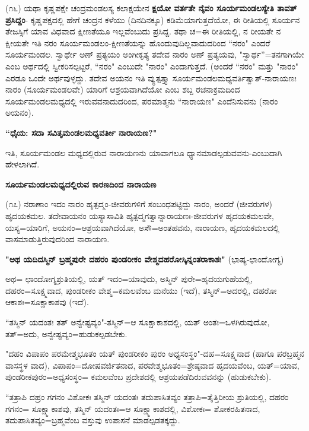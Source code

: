 (೧೬) ಯಥಾ ಕೃಷ್ಣಪಕ್ಷೇ ಚಂದ್ರಮಂಡಲಸ್ಯ ಕಲಾಕ್ಷಯೇನ \textbf{ಕ್ಷಯೋ ವರ್ತತೇ ನೈವಂ ಸೂರ್ಯಮಂಡಲಸ್ಯೇತಿ ತಾವತ್ ಪ್ರಸಿದ್ದಂ}- ಕೃಷ್ಣಪಕ್ಷದಲ್ಲಿ ಹೇಗೆ ಚಂದ್ರನ ಕಳೆಯು (ದಿನದಿನಕ್ಕೂ) ಕಡಿಮೆಯಾಗುತ್ತದೆಯೋ, ಈ ರೀತಿಯಲ್ಲಿ ಸೂರ್ಯನ ತೇಜಸ್ಸಿಗೆ ಯಾವ ವಿಧವಾದ ಕ್ಷೀಣತೆಯೂ ಇಲ್ಲವೆಂಬುದು ಪ್ರಸಿದ್ದ. ತಥಾ ಚ=ಈ ರೀತಿಯಲ್ಲಿ, ನ ರೀಯತೇ ನ ಕ್ಷೀಯತೇ ಇತಿ ನರಂ ಸೂರ್ಯಮಂಡಲಂ-ಕ್ಷೀಣತೆಯನ್ನು ಹೊಂದುವುದಿಲ್ಲವಾದುದರಿಂದ ``ನರಂ" ಎಂದರೆ ಸೂರ್ಯಮಂಡಲ. ಸ್ವಾರ್ಥೇ ಅಣ್ ಪ್ರತ್ಯಯಂ ಅಂಗೀಕೃತ್ಯ ತದೇವ ನಾರಂ ಅಣ್ ಪ್ರತ್ಯಯವು, "ಸ್ವಾರ್ಥ''=ತನಗಾಗಿಯೇ ಎಂಬ ಅರ್ಥದಲ್ಲಿ ಸ್ವೀಕರಿಸಲ್ಪಟ್ಟರೆ, ``ನರಂ" ಎಂಬುದೇ "ನಾರಂ" ಎಂದಾಗುತ್ತದೆ. (ಅಂದರೆ “ನರಂ" ಮತ್ತು "ನಾರಂ" ಎರಡೂ ಒಂದೇ ಅರ್ಥವುಳ್ಳದ್ದು. ತದೇವ ಅಯನಂ ಇತಿ ವ್ಯುತ್ಪತ್ತ್ಯಾ ಸೂರ್ಯಮಂಡಲಮಧ್ಯವರ್ತಿತ್ವಾತ್-ನಾರಾಯಣಃ ನಾರಂ (ಸೂರ್ಯಮಂಡಲವೇ) ಯಾರಿಗೆ ಆಶ್ರಯವಾಗಿದೆಯೋ ಎಂಬ ಶಬ್ದ ರಚನಾಕ್ರಮದಿಂದ ಸೂರ್ಯಮಂಡಲಮಧ್ಯದಲ್ಲಿ ಇರುವವನಾದುದರಿಂದ, ಪರಮಾತ್ಮನು ``ನಾರಾಯಣ" ಎಂದೆನಿಸುವನು (ನಾರಂ ಅಯನಂ).

\begin{center}
\textbf{``ಧೈಯ: ಸದಾ ಸವಿತೃಮಂಡಲಮಧ್ಯವರ್ತೀ ನಾರಾಯಣ?"}
\end{center}

\noindent
ಇತಿ, ಸೂರ್ಯಮಂಡಲ ಮಧ್ಯದಲ್ಲಿರುವ ನಾರಾಯಣನು ಯಾವಾಗಲೂ ಧ್ಯಾನಮಾಡಲ್ಪಡುವವನು-ಎಂಬುದಾಗಿ ಹೇಳಲಾಗಿದೆ.

\begin{center}
\textbf{ಸೂರ್ಯಮಂಡಲಮಧ್ಯದಲ್ಲಿರುವ ಕಾರಣದಿಂದ ನಾರಾಯಣ}
\end{center}

(೧೭) ನರಾಣಾಂ ಇದಂ ನಾರಂ ಹೃತ್ಪದ್ಮಂ-ಜೀವರುಗಳಿಗೆ ಸಂಬಂಧಪಟ್ಟಿದ್ದು ನಾರಂ, ಅಂದರೆ (ಜೀವರುಗಳ) ಹೃದಯಕಮಲ. ತದೇವಾಯನಂ ಯಸ್ಯಾಸಾವಿತಿ ಹೃತ್ಪದ್ಮಗತ್ವಾನ್ನಾರಾಯಣಃ-ಜೀವರುಗಳ ಹೃದಯಕಮಲವೇ, ಯಸ್ಯ=ಯಾರಿಗೆ, ಅಯನಂ=ಆಶ್ರಯವಾಗಿದೆಯೋ, ಅಸೌ=ಅಂತಹವನು, ನಾರಾಯಣ, ಹೃದಯಕಮಲದಲ್ಲಿ ವಾಸಮಾಡುತ್ತಿರುವುದರಿಂದ ನಾರಾಯಣ.

\textbf{"ಅಥ ಯದಿದಸ್ಮಿನ್ ಬ್ರಹ್ಮಪುರೇ ದಹರಂ ಪುಂಡರೀಕಂ ವೇಶ್ಮದಹರೋಸ್ಕಿನ್ನಂತರಾಕಾಶಃ"} (ಭಾಷ್ಯ-ಛಾಂದೋಗ್ಯ)

ಅಥ= ಛಾಂದೋಗ್ಯಶ್ರುತಿಯಲ್ಲಿ, ಯತ್ ಇದಂ=ಯಾವುದು, ಅಸ್ಮಿನ್ ಪುರೇ=ಹೃದಯಗುಹೆಯಲ್ಲಿ, ದಹರಂ=ಸೂಕ್ಷ್ಮವಾದ, ಪುಂಡರೀಕಂ ವೇಶ್ಮ=ಕಮಲವೆಂಬ ಮನೆಯು (ಇದೆ), ತಸ್ಮಿನ್=ಅದರಲ್ಲಿ, ದಹರೋ ಆಕಾಶಃ=ಸೂಕ್ಷಾಕಾಶವು (ಇದೆ).

``ತಸ್ಮಿನ್ ಯದಂತಃ ತತ್ ಅನ್ವೇಷ್ಟವ್ಯಂ"-ತಸ್ಮಿನ್=ಆ ಸೂಕ್ಷಾಕಾಶದಲ್ಲಿ, ಯತ್ ಅಂತಃ=ಒಳಗಿರುವುದೋ, ತತ್=ಅದು, ಅನ್ವೇಷ್ಟವ್ಯಂ=ಹುಡುಕಲ್ಪಡಬೇಕು.

"ದಹಂ ವಿಪಾಪಂ ಪರಮೇಶ್ಮಭೂತಂ ಯತ್ ಪುಂಡರೀಕಂ ಪುರಂ ಅಧ್ಯಸಂಸ್ಥಂ"-ದಹ=ಸೂಕ್ಷ್ಮನಾದ (ಹಾಗೂ ಪರಬ್ರಹ್ಮನ ವಾಸಸ್ಥಳ ವಾದ), ವಿಪಾಪಂ=ದೋಷವರ್ಜಿತನಾದ, ಪರವೇಶ್ಮಭೂತಂ=ಶ್ರೇಷ್ಠವಾದ ಹೃದಯವೆಂಬ, ಯತ್=ಯಾವ, ಪುಂಡರೀಕಪುರಂ=ಅಧ್ಯಸಂಸ್ಥಂ= ಕಮಲವೆಂಬ ಪ್ರದೇಶದಲ್ಲಿ ಆಶ್ರಯಪಡೆದಿರುವವನನ್ನು (ಹುಡುಕಬೇಕು).

``ತತ್ರಾಪಿ ದಹ್ರಂ ಗಗನಂ ವಿಶೋಕಃ ತಸ್ಮಿನ್ ಯದಂತಃ ತದುಪಾಸಿತವ್ಯಂ ತತ್ರಾಪಿ=ತೈತ್ತಿರೀಯ ಶ್ರುತಿಯಲ್ಲಿ, ದಹರಂ ಗಗನಂ= ಸೂಕ್ಷ್ಮಾಕಾಶವು, ತಸ್ಮಿನ್ ಯದಂತಃ=ಆ ಸೂಕ್ಷ್ಮಾಕಾಶದಲ್ಲಿ, ವಿಶೋಕಃ= ಶೋಕರಹಿತನಾದ, ತದುಪಾಸಿತವ್ಯಂ=ಬ್ರಹ್ಮವೆಂಬ ವಸ್ತುವು ಉಪಾಸನೆ ಮಾಡಲ್ಪಡತಕ್ಕದ್ದು.

